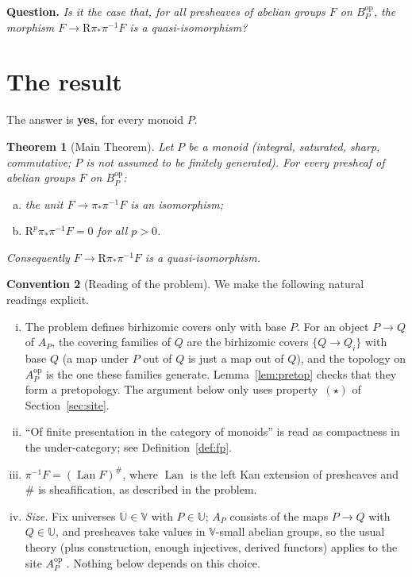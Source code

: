 \documentclass[11pt]{article}
\newtheorem{theorem}{Theorem}[section]
\theoremstyle{definition}
\newtheorem{convention}[theorem]{Convention}
\theoremstyle{remark}
\newcommand{\Lan}{\operatorname{Lan}}
\begin{document}
\medskip\noindent\textbf{Question.} \emph{Is it the case that, for all presheaves of abelian groups $F$ on $B_P^{\mathrm{op}}$, the morphism $F\to \mathrm{R}\pi_*\pi^{-1}F$ is a quasi-isomorphism?}

\section{The result}

The answer is \textbf{yes}, for every monoid $P$.

\begin{theorem}[Main Theorem]\label{thm:main}
Let $P$ be a monoid (integral, saturated, sharp, commutative; $P$ is \emph{not} assumed to be finitely generated). For every presheaf of abelian groups $F$ on $B_P^{\mathrm{op}}$:
\begin{enumerate}[(a)]
\item the unit $F\to\pi_*\pi^{-1}F$ is an isomorphism;
\item $\mathrm{R}^p\pi_*\pi^{-1}F=0$ for all $p>0$.
\end{enumerate}
Consequently $F\to\mathrm{R}\pi_*\pi^{-1}F$ is a quasi-isomorphism.
\end{theorem}

\begin{convention}[Reading of the problem]\label{conv}
We make the following natural readings explicit.
\begin{enumerate}[(i)]
\item The problem defines birhizomic covers only with base $P$. For an object $P\to Q$ of $A_P$, the covering families of $Q$ are the birhizomic covers $\{Q\to Q_i\}$ with base $Q$ (a map under $P$ out of $Q$ is just a map out of $Q$), and the topology on $A_P^{\mathrm{op}}$ is the one these families generate. Lemma~\ref{lem:pretop} checks that they form a pretopology. The argument below only uses property~$(\star)$ of Section~\ref{sec:site}.
\item ``Of finite presentation in the category of monoids'' is read as compactness in the under-category; see Definition~\ref{def:fp}.
\item $\pi^{-1}F=(\Lan F)^\#$, where $\Lan$ is the left Kan extension of presheaves and $\#$ is sheafification, as described in the problem.
\item \emph{Size.} Fix universes $\mathbb U\in\mathbb V$ with $P\in\mathbb U$; $A_P$ consists of the maps $P\to Q$ with $Q\in\mathbb U$, and presheaves take values in $\mathbb V$-small abelian groups, so the usual theory (plus construction, enough injectives, derived functors) applies to the site $A_P^{\mathrm{op}}$ \cite[Exp.~I]{SGA4}. Nothing below depends on this choice.
\end{enumerate}
\end{convention}
\end{document}
